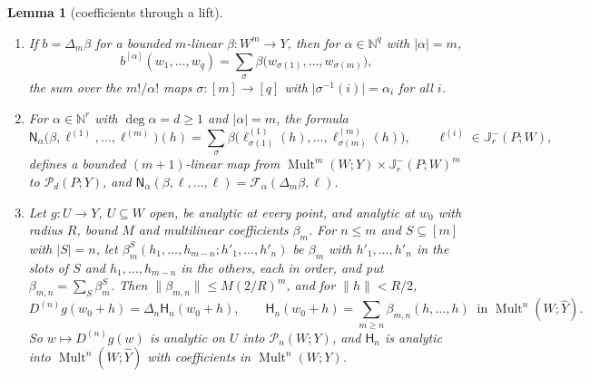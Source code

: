 \documentclass[11pt]{amsart}
\newtheorem{lemma}[theorem]{Lemma}
\theoremstyle{definition}
\theoremstyle{remark}
\numberwithin{equation}{section}
\newcommand{\N}{\mathbb N}
\newcommand{\Mult}{\operatorname{Mult}}
\newcommand{\abs}[1]{\lvert #1\rvert}
\newcommand{\norm}[1]{\lVert #1\rVert}
\theoremstyle{plain}
\theoremstyle{definition}
\theoremstyle{plain}
\newcommand{\cP}{\mathcal P}
\begin{document}
\begin{lemma}[coefficients through a lift]\label{dp:13:lem:lifts}
\leavevmode
\begin{enumerate}
\item If $b=\Delta_m\beta$ for a bounded $m$-linear $\beta\colon W^m\to Y$, then for $\alpha\in\N^q$ with $\abs\alpha=m$,
\begin{equation}\label{dp:13:eq:lift-coeff}
 b^{[\alpha]}(w_1,\dots,w_q)=\sum_\sigma\beta\bigl(w_{\sigma(1)},\dots,w_{\sigma(m)}\bigr),
\end{equation}
the sum over the $m!/\alpha!$ maps $\sigma\colon[m]\to[q]$ with $\abs{\sigma^{-1}(i)}=\alpha_i$ for all $i$.
\item For $\alpha\in\N^r$ with $\deg\alpha=d\ge1$ and $\abs\alpha=m$, the formula
\[
 \mathsf N_\alpha\bigl(\beta,\ell^{(1)},\dots,\ell^{(m)}\bigr)(h)=\sum_\sigma\beta\bigl(\ell^{(1)}_{\sigma(1)}(h),\dots,\ell^{(m)}_{\sigma(m)}(h)\bigr),\qquad\ell^{(i)}\in\mathbb J^-_r(P;W),
\]
defines a bounded $(m+1)$-linear map from $\Mult^m(W;Y)\times\mathbb J^-_r(P;W)^m$ to $\cP_d(P;Y)$, and $\mathsf N_\alpha(\beta,\ell,\dots,\ell)=\mathcal F_\alpha(\Delta_m\beta,\ell)$.
\item Let $g\colon U\to Y$, $U\subseteq W$ open, be analytic at every point, and analytic at $w_0$ with radius $R$, bound $M$ and multilinear coefficients $\beta_m$. For $n\le m$ and $S\subseteq[m]$ with $\abs S=n$, let $\beta_m^S(h_1,\dots,h_{m-n};h'_1,\dots,h'_n)$ be $\beta_m$ with $h'_1,\dots,h'_n$ in the slots of $S$ and $h_1,\dots,h_{m-n}$ in the others, each in order, and put $\beta_{m,n}=\sum_S\beta_m^S$. Then $\norm{\beta_{m,n}}\le M(2/R)^m$, and for $\norm h<R/2$,
\begin{equation}\label{dp:13:eq:hasse-analytic}
 D^{(n)}g(w_0+h)=\Delta_n\mathsf H_n(w_0+h),\qquad\mathsf H_n(w_0+h)=\sum_{m\ge n}\beta_{m,n}(h,\dots,h)\ \text{ in }\Mult^n(W;\widehat Y).
\end{equation}
So $w\mapsto D^{(n)}g(w)$ is analytic on $U$ into $\cP_n(W;Y)$, and $\mathsf H_n$ is analytic into $\Mult^n(W;\widehat Y)$ with coefficients in $\Mult^n(W;Y)$.
\end{enumerate}
\end{lemma}
\end{document}
